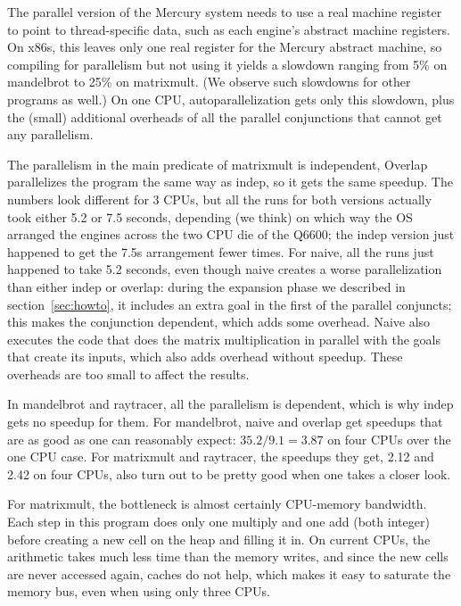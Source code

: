 The parallel version of the Mercury system
needs to use a real machine register
to point to thread-specific data,
such as each engine's abstract machine registers.
On x86s, this leaves only one real register for the Mercury abstract machine,
so compiling for parallelism but not using it
yields a slowdown ranging from 5\% on mandelbrot to 25\% on matrixmult.
(We observe such slowdowns for other programs as well.)
On one CPU, autoparallelization gets only this slowdown,
plus the (small) additional overheads of all the parallel conjunctions
that cannot get any parallelism.

The parallelism in the main predicate of matrixmult is independent,
Overlap parallelizes the program the same way as indep,
so it gets the same speedup.
The numbers look different for 3 CPUs,
but all the runs for both versions actually took either 5.2 or 7.5 seconds,
depending (we think) on which way
the OS arranged the engines across the two CPU die of the Q6600;
the indep version just happened to get the 7.5s arrangement fewer times.
For naive, all the runs just happened to take 5.2 seconds,
even though naive creates a worse parallelization than either indep or overlap:
during the expansion phase we described in section~\ref{sec:howto},
it includes an extra goal in the first of the parallel conjuncts;
this makes the conjunction dependent, which adds some overhead.
Naive also executes the code that does the matrix multiplication
in parallel with the goals that create its inputs,
which also adds overhead without speedup.
These overheads are too small to affect the results.

In mandelbrot and raytracer, all the parallelism is dependent,
which is why indep gets no speedup for them.
For mandelbrot, naive and overlap get speedups
that are as good as one can reasonably expect:
$35.2/9.1 = 3.87$ on four CPUs over the one CPU case.
For matrixmult and raytracer, the speedups they get,
2.12 and 2.42 on four CPUs,
also turn out to be pretty good when one takes a closer look.

For matrixmult, the bottleneck is almost certainly CPU-memory bandwidth.
Each step in this program does only one multiply and one add (both integer)
before creating a new cell on the heap and filling it in.
On current CPUs, the arithmetic takes much less time than the memory writes,
and since the new cells are never accessed again, caches do not help,
which makes it easy to saturate the memory bus, even when using only three CPUs.

